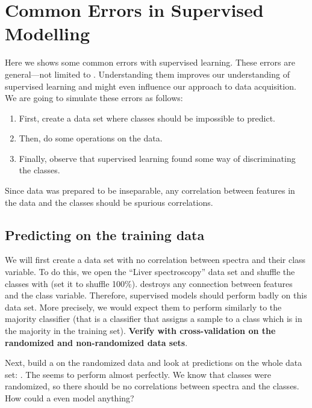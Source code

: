 \chapter{Common Errors in Supervised Modelling}

Here we shows some common errors with supervised learning. These errors are general---not limited to \mutation. Understanding them improves our understanding of supervised learning and might even influence our approach to data acquisition. We are going to simulate these errors as follows:

\begin{enumerate}
\item First, create a data set where classes should be impossible to predict.
\item Then, do some operations on the data.
\item Finally, observe that supervised learning found some way of discriminating the classes.
\end{enumerate}

Since data was prepared to be inseparable, any correlation between features in the data and the classes should be spurious correlations.


\section{Predicting on the training data}

We will first create a data set with no correlation between spectra and their class variable. To do this, we open the ``Liver spectroscopy'' data set and shuffle the classes with  (set it to shuffle 100\%).  destroys any connection between features and the class variable. Therefore, supervised models should perform badly on this data set. More precisely, we would expect them to perform similarly to the majority classifier (that is a classifier that assigns a sample to a class which is in the majority in the training set). \textbf{Verify with cross-validation on the randomized and non-randomized data sets}.

Next, build a  on the randomized data and look at predictions on the whole data set: . The  seems to perform almost perfectly. We know that classes were randomized, so there should be no correlations between spectra and the classes. How could a  even model anything?

